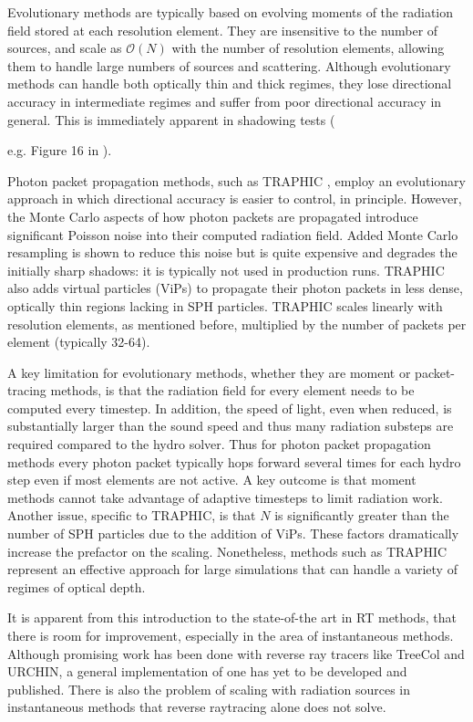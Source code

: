 \documentclass[fleq,usenatbib]{mnras}
\begin{document}
Evolutionary methods are typically based on evolving moments of the radiation 
field stored at each resolution element. They are insensitive to the number of 
sources, and scale as $\mathcal{O}(N)$ with the number of resolution elements, 
allowing them to handle large numbers of sources and scattering. Although 
evolutionary methods can handle both optically thin and thick regimes, they 
lose directional accuracy in intermediate regimes and suffer from poor 
directional accuracy in general. This is immediately apparent in shadowing 
tests ({e.g. Figure 16 in \citealt{rosdahlEt13}).

Photon packet propagation methods, such as TRAPHIC \citep{pawlikSchaye08}, 
employ an evolutionary approach in which directional accuracy is easier to 
control, in principle. However, the Monte Carlo aspects of how photon packets 
are propagated introduce significant Poisson noise into their computed 
radiation field. Added Monte Carlo resampling is shown to reduce this noise 
but is quite expensive and degrades the initially sharp shadows: it is 
typically not used in production runs. TRAPHIC also adds virtual particles 
(ViPs) to propagate their photon packets in less dense, optically thin regions 
lacking in SPH particles. TRAPHIC scales linearly with resolution elements, as 
mentioned before, multiplied by the number of packets per element (typically 32-64).

A key limitation for evolutionary methods, whether they are moment or packet-tracing methods,
is that the radiation field for every 
element needs to be computed every timestep. In addition, the speed of light, 
even when reduced, is substantially larger than the sound speed and thus many 
radiation substeps are required compared to the hydro solver. Thus for photon 
packet propagation methods every photon packet typically hops forward several 
times for each hydro step even if most elements are not active.
A key outcome is that moment methods cannot take
advantage of adaptive timesteps to limit radiation work.  Another issue, specific
to TRAPHIC, is that $N$ is significantly greater than the number of SPH 
particles due to the addition of ViPs. These factors dramatically increase 
the prefactor on the scaling.  Nonetheless, methods such as TRAPHIC 
represent an effective approach for large simulations that can handle a variety 
of regimes of optical depth.

It is apparent from this introduction to the state-of-the art in RT methods, 
that there is room for improvement, especially in the area of instantaneous 
methods. Although promising work has been done with reverse ray tracers like 
TreeCol and URCHIN, a general implementation of one has yet to be developed 
and published. There is also the problem of scaling with radiation sources in 
instantaneous methods that reverse raytracing alone does not solve.

}
\end{document}
